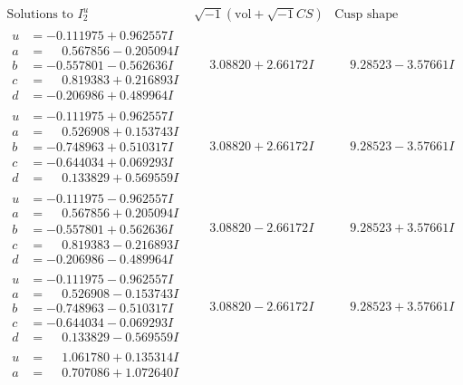 \documentclass[1p]{elsarticle_modified}
\theoremstyle{definition}
\newcommand{\I}{\sqrt{-1}}
\begin{document}
$$\begin{array}{c|c|c}  
\text{Solutions to }I^u_{2}& \I (\text{vol} + \sqrt{-1}CS) & \text{Cusp shape}\\
 \hline 
\begin{aligned}
u &= -0.111975 + 0.962557 I \\
a &= \phantom{-}0.567856 - 0.205094 I \\
b &= -0.557801 - 0.562636 I \\
c &= \phantom{-}0.819383 + 0.216893 I \\
d &= -0.206986 + 0.489964 I\end{aligned}
 & \phantom{-}3.08820 + 2.66172 I & \phantom{-}9.28523 - 3.57661 I \\ \hline\begin{aligned}
u &= -0.111975 + 0.962557 I \\
a &= \phantom{-}0.526908 + 0.153743 I \\
b &= -0.748963 + 0.510317 I \\
c &= -0.644034 + 0.069293 I \\
d &= \phantom{-}0.133829 + 0.569559 I\end{aligned}
 & \phantom{-}3.08820 + 2.66172 I & \phantom{-}9.28523 - 3.57661 I \\ \hline\begin{aligned}
u &= -0.111975 - 0.962557 I \\
a &= \phantom{-}0.567856 + 0.205094 I \\
b &= -0.557801 + 0.562636 I \\
c &= \phantom{-}0.819383 - 0.216893 I \\
d &= -0.206986 - 0.489964 I\end{aligned}
 & \phantom{-}3.08820 - 2.66172 I & \phantom{-}9.28523 + 3.57661 I \\ \hline\begin{aligned}
u &= -0.111975 - 0.962557 I \\
a &= \phantom{-}0.526908 - 0.153743 I \\
b &= -0.748963 - 0.510317 I \\
c &= -0.644034 - 0.069293 I \\
d &= \phantom{-}0.133829 - 0.569559 I\end{aligned}
 & \phantom{-}3.08820 - 2.66172 I & \phantom{-}9.28523 + 3.57661 I \\ \hline\begin{aligned}
u &= \phantom{-}1.061780 + 0.135314 I \\
a &= \phantom{-}0.707086 + 1.072640 I \\

\end{aligned}
\end{array}$$
\end{document}
